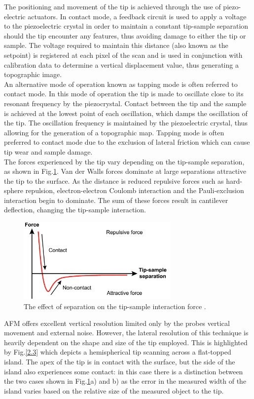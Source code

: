 The positioning and movement of the tip is achieved through the use of piezo-electric actuators. In contact mode, a feedback circuit is used to apply a voltage to the piezoelectric crystal in order to maintain a constant tip-sample separation should the tip encounter any features, thus avoiding damage to either the tip or sample. The voltage required to maintain this distance (also known as the setpoint) is registered at each pixel of the scan and is used in conjunction with calibration data to determine a vertical displacement value, thus generating a topographic image.\\
An alternative mode of operation known as tapping mode is often referred to contact mode. In this mode of operation the tip is made to oscillate close to its resonant frequency by the piezocrystal. Contact  between the tip and the sample is achieved at the lowest point of each oscillation, which damps the oscillation of the tip. The oscillation frequency is maintained by the piezoelectric crystal, thus allowing for the generation of a topographic map. Tapping mode is often preferred to contact mode due to the exclusion of lateral friction which can cause tip wear and sample damage.\\
The forces experienced by the tip vary depending on the tip-sample separation, as shown in Fig.\ref{2.2}. Van der Walls forces dominate at large separations attractive the tip to the surface. As the distance is reduced repulsive forces such as hard-sphere repulsion, electron-electron Coulomb interaction and the Pauli-exclusion interaction begin to dominate. The sum of these forces result in cantilever deflection, changing the tip-sample interaction.

\begin{figure}[h]
	\centering
	\includegraphics[width=0.7\textwidth]{Figs/Ch2/AFMint.png}
	\caption {The effect of separation on the tip-sample interaction force \cite{Zhu2010}.}
	\label{2.2}
\end{figure}
\FloatBarrier

AFM offers excellent vertical resolution limited only by the probes vertical movement and external noise. However, the lateral resolution of this technique is heavily dependent on the shape and size of the tip employed. This is highlighted by Fig.\ref{2.3} which depicts a hemispherical tip scanning across a flat-topped island. The apex of the tip is in contact with the surface, but the side of the island also experiences some contact: in this case there is a distinction between the two cases shown in Fig.\ref{2.2}a) and b) as the error in the measured width of the island varies based on the relative size of the measured object to the tip.

